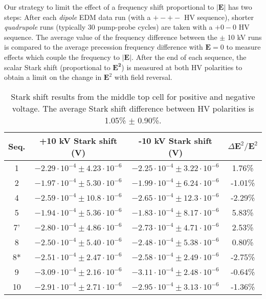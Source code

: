 \documentclass [10pt, twoside] {uwthesis}[2012/04/02]
\begin{document}
Our strategy to limit the effect of a frequency shift proportional to $|\mathbf{E}|$ has two steps: After each \textit{dipole} EDM data run (with a $+-+-$ HV sequence), shorter \textit{quadrupole} runs (typically 30 pump-probe cycles) are taken with a $+0-0$ HV sequence. The average value of the frequency difference between the $\pm$ 10 kV runs is compared to the average precession frequency difference with $\mathbf{E}=0$ to measure effects which couple the frequency to $|\mathbf{E}|$. After the end of each sequence, the scalar Stark shift (proportional to $\mathbf{E^2}$) is measured at both HV polarities to obtain a limit on the change in $\mathbf{E}^2$ with field reversal.

\begin{table} 
\footnotesize													
\begin{center}
\caption[Top cell quadratic Stark shift results] 
{\narrower Stark shift results from the middle top cell for positive and negative voltage. The average Stark shift difference between HV polarities is 1.05\% $\pm$ 0.90\%.}   
\label{Stark_MT}
\begin{tabular}{cccc}
\hline \hline									
Seq. & +10 kV Stark shift (V) & -10 kV Stark shift (V) & $\Delta \mathbf{E}^2/\mathbf{E}^2$ \\
\hline        	
1   & $-2.29 \cdot 10^{-4} \pm 4.23 \cdot 10^{-6}$ & $-2.25 \cdot 10^{-4} \pm 3.22 \cdot 10^{-6}$ & 1.76\%  \\
2   & $-1.97 \cdot 10^{-4} \pm 5.30 \cdot 10^{-6}$ & $-1.99 \cdot 10^{-4} \pm 6.24 \cdot 10^{-6}$ & -1.01\% \\
4   & $-2.59 \cdot 10^{-4} \pm 10.8 \cdot 10^{-6}$ & $-2.65 \cdot 10^{-4} \pm 12.3 \cdot 10^{-6}$ & -2.29\% \\
5   & $-1.94 \cdot 10^{-4} \pm 5.36 \cdot 10^{-6}$ & $-1.83 \cdot 10^{-4} \pm 8.17 \cdot 10^{-6}$ & 5.83\%  \\
7'  & $-2.80 \cdot 10^{-4} \pm 4.86 \cdot 10^{-6}$ & $-2.73 \cdot 10^{-4} \pm 4.71 \cdot 10^{-6}$ & 2.53\%  \\
8   & $-2.50 \cdot 10^{-4} \pm 5.40 \cdot 10^{-6}$ & $-2.48 \cdot 10^{-4} \pm 5.38 \cdot 10^{-6}$ & 0.80\%  \\
8*  & $-2.51 \cdot 10^{-4} \pm 2.47 \cdot 10^{-6}$ & $-2.58 \cdot 10^{-4} \pm 2.49 \cdot 10^{-6}$ & -2.75\% \\
9   & $-3.09 \cdot 10^{-4} \pm 2.16 \cdot 10^{-6}$ & $-3.11 \cdot 10^{-4} \pm 2.48 \cdot 10^{-6}$ & -0.64\% \\
10  & $-2.91 \cdot 10^{-4} \pm 2.71 \cdot 10^{-6}$ & $-2.95 \cdot 10^{-4} \pm 3.13 \cdot 10^{-6}$ & -1.36\% \\

\end{tabular}
\end{center}
\end{table}
\end{document}
